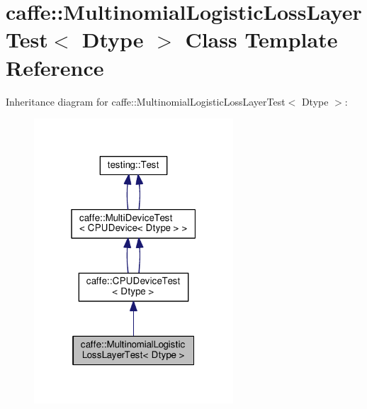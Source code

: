 \hypertarget{classcaffe_1_1_multinomial_logistic_loss_layer_test}{}\section{caffe\+:\+:Multinomial\+Logistic\+Loss\+Layer\+Test$<$ Dtype $>$ Class Template Reference}
\label{classcaffe_1_1_multinomial_logistic_loss_layer_test}


Inheritance diagram for caffe\+:\+:Multinomial\+Logistic\+Loss\+Layer\+Test$<$ Dtype $>$\+:
\nopagebreak
\begin{figure}[H]
\begin{center}
\leavevmode
\includegraphics[width=211pt]{classcaffe_1_1_multinomial_logistic_loss_layer_test__inherit__graph}
\end{center}
\end{figure}
